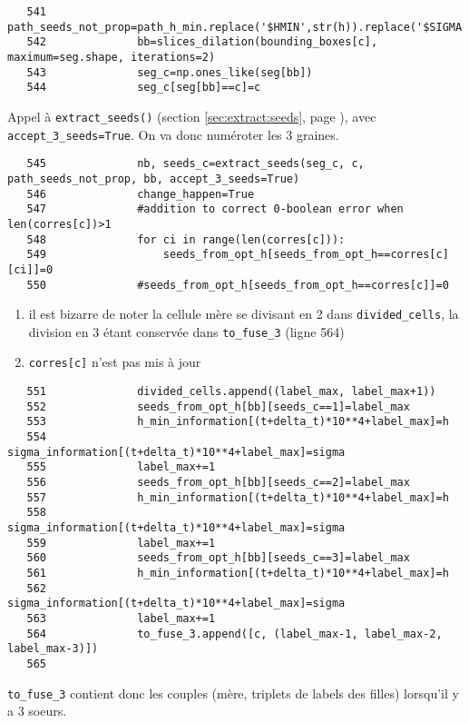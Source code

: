 \documentclass{article}
\def \mycolor {red}
\begin{document}
\color{black}
\begin{verbatim} 
   541	            path_seeds_not_prop=path_h_min.replace('$HMIN',str(h)).replace('$SIGMA',str(sigma));
   542	            bb=slices_dilation(bounding_boxes[c], maximum=seg.shape, iterations=2)
   543	            seg_c=np.ones_like(seg[bb])
   544	            seg_c[seg[bb]==c]=c
\end{verbatim} 
\color{\mycolor}
Appel \`a \texttt{extract\_seeds()} (section \ref{sec:extract:seeds}, page \pageref{sec:extract:seeds}), avec \verb| accept_3_seeds=True|. On va donc num\'eroter les 3 graines.
\color{black}
\begin{verbatim}
   545	            nb, seeds_c=extract_seeds(seg_c, c, path_seeds_not_prop, bb, accept_3_seeds=True)
   546	            change_happen=True
   547	            #addition to correct 0-boolean error when len(corres[c])>1
   548	            for ci in range(len(corres[c])):
   549	                seeds_from_opt_h[seeds_from_opt_h==corres[c][ci]]=0
   550	            #seeds_from_opt_h[seeds_from_opt_h==corres[c]]=0
\end{verbatim} 
\color{\mycolor}
\begin{enumerate}
\item il est bizarre de noter la cellule m\`ere se divisant en 2 dans \verb|divided_cells|, la division en 3 \'etant conserv\'ee dans \verb|to_fuse_3| (ligne 564)
\item \verb|corres[c]| n'est pas mis \`a jour
\end{enumerate}
\color{black}
\begin{verbatim}
   551	            divided_cells.append((label_max, label_max+1))
   552	            seeds_from_opt_h[bb][seeds_c==1]=label_max
   553	            h_min_information[(t+delta_t)*10**4+label_max]=h
   554	            sigma_information[(t+delta_t)*10**4+label_max]=sigma
   555	            label_max+=1
   556	            seeds_from_opt_h[bb][seeds_c==2]=label_max
   557	            h_min_information[(t+delta_t)*10**4+label_max]=h
   558	            sigma_information[(t+delta_t)*10**4+label_max]=sigma
   559	            label_max+=1
   560	            seeds_from_opt_h[bb][seeds_c==3]=label_max
   561	            h_min_information[(t+delta_t)*10**4+label_max]=h
   562	            sigma_information[(t+delta_t)*10**4+label_max]=sigma
   563	            label_max+=1
   564	            to_fuse_3.append([c, (label_max-1, label_max-2, label_max-3)])
   565	
\end{verbatim} 
\color{\mycolor}
\verb|to_fuse_3| contient donc les couples (m\`ere, triplets de labels des filles) lorsqu'il y a 3 soeurs.
\end{document}
